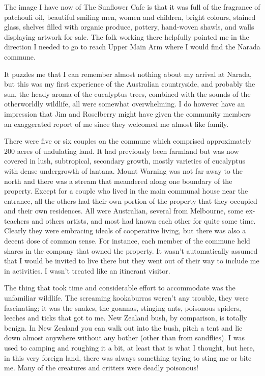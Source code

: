 The image I have now of The Sunflower Cafe is that it was full of the
fragrance of patchouli oil, beautiful smiling men, women and children,
bright colours, stained glass, shelves filled with organic produce,
pottery, hand-woven shawls, and walls displaying artwork for sale. The
folk working there helpfully pointed me in the direction I needed to go
to reach Upper Main Arm where I would find the Narada commune.

It puzzles me that I can remember almost nothing about my arrival at
Narada, but this was my first experience of the Australian countryside,
and probably the sun, the heady aroma of the eucalyptus trees, combined
with the sounds of the otherworldly wildlife, all were somewhat
overwhelming. I do however have an impression that Jim and Roselberry
might have given the community members an exaggerated report of me since
they welcomed me almost like family.

There were five or six couples on the commune which comprised
approximately 200 acres of undulating land. It had previously been
farmland but was now covered in lush, subtropical, secondary growth,
mostly varieties of eucalyptus with dense undergrowth of lantana. Mount
Warning was not far away to the north and there was a stream that
meandered along one boundary of the property. Except for a couple who
lived in the main communal house near the entrance, all the others had
their own portion of the property that they occupied and their own
residences. All were Australian, several from Melbourne, some
ex-teachers and others artists, and most had known each other for quite
some time. Clearly they were embracing ideals of cooperative living, but
there was also a decent dose of common sense. For instance, each member
of the commune held shares in the company that owned the property. It
wasn't automatically assumed that I would be invited to live there but
they went out of their way to include me in activities. I wasn't treated
like an itinerant visitor.

The thing that took time and considerable effort to accommodate was the
unfamiliar wildlife. The screaming kookaburras weren't any trouble, they were
fascinating; it was the snakes, the goannas, stinging ants, poisonous
spiders, leeches and ticks that got to me. New Zealand bush, by
comparison, is totally benign. In New Zealand you can walk out into the
bush, pitch a tent and lie down almost anywhere without any bother
(other than from sandflies). I was used to camping and roughing it a
bit, at least that is what I thought, but here, in this very foreign
land, there was always something trying to sting me or bite me. Many of
the creatures and critters were deadly poisonous!

